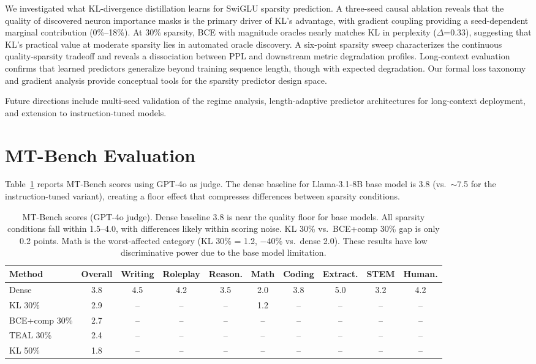\documentclass[11pt,a4paper]{article}
\begin{document}
We investigated what KL-divergence distillation learns for SwiGLU sparsity prediction. A three-seed causal ablation reveals that the quality of discovered neuron importance masks is the primary driver of KL's advantage, with gradient coupling providing a seed-dependent marginal contribution (0\%--18\%). At 30\% sparsity, BCE with magnitude oracles nearly matches KL in perplexity ($\Delta$=0.33), suggesting that KL's practical value at moderate sparsity lies in automated oracle discovery. A six-point sparsity sweep characterizes the continuous quality-sparsity tradeoff and reveals a dissociation between PPL and downstream metric degradation profiles. Long-context evaluation confirms that learned predictors generalize beyond training sequence length, though with expected degradation. Our formal loss taxonomy and gradient analysis provide conceptual tools for the sparsity predictor design space.

Future directions include multi-seed validation of the regime analysis, length-adaptive predictor architectures for long-context deployment, and extension to instruction-tuned models.

\appendix
\section{MT-Bench Evaluation}
\label{app:mtbench}

Table~\ref{tab:mtbench} reports MT-Bench scores using GPT-4o as judge. The dense baseline for Llama-3.1-8B base model is 3.8 (vs.\ $\sim$7.5 for the instruction-tuned variant), creating a floor effect that compresses differences between sparsity conditions.

\begin{table}[h]
\centering
\small
\begin{tabular}{lccccccccc}
\toprule
Method & Overall & Writing & Roleplay & Reason. & Math & Coding & Extract. & STEM & Human. \\
\midrule
Dense & 3.8 & 4.5 & 4.2 & 3.5 & 2.0 & 3.8 & 5.0 & 3.2 & 4.2 \\
KL 30\% & 2.9 & -- & -- & -- & 1.2 & -- & -- & -- & -- \\
BCE+comp 30\% & 2.7 & -- & -- & -- & -- & -- & -- & -- & -- \\
TEAL 30\% & 2.4 & -- & -- & -- & -- & -- & -- & -- & -- \\
KL 50\% & 1.8 & -- & -- & -- & -- & -- & -- & -- & -- \\
\bottomrule
\end{tabular}
\caption{MT-Bench scores (GPT-4o judge). Dense baseline 3.8 is near the quality floor for base models. All sparsity conditions fall within 1.5--4.0, with differences likely within scoring noise. KL 30\% vs.\ BCE+comp 30\% gap is only 0.2 points. Math is the worst-affected category (KL 30\% = 1.2, $-$40\% vs.\ dense 2.0). These results have low discriminative power due to the base model limitation.}
\label{tab:mtbench}
\end{table}
\end{document}
